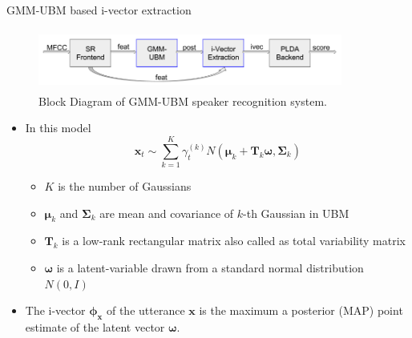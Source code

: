\documentclass{beamer}
\begin{document}
\begin{frame}{GMM-UBM based i-vector extraction}
\begin{figure}
      \centering
      \includegraphics[width=10cm, height=2cm]{figures/UBM_ivec_blockdiagram.png}
      \vspace{-4pt}
      \caption{Block Diagram of GMM-UBM speaker recognition system.}
      \label{fig:gmm_ivec2}
  \end{figure}
  \vspace{-15pt}
  \begin{itemize}
  \item { In this model
    \begin{equation}
     \mathbf{x}_t \sim \sum_{k=1}^{K} \gamma_{t}^{(k)} N( \boldsymbol{\mu}_k + \mathbf{T}_k\boldsymbol{\omega}, \mathbf{\Sigma}_k)
   \end{equation}
    \begin{itemize}
        \item  $K$ is the number of Gaussians
        \item  $\boldsymbol{\mu}_k$ and $\mathbf{\Sigma}_k$ are mean and covariance of $k$-th Gaussian in UBM
        \item $\mathbf{T}_k$ is a low-rank rectangular matrix also called as total variability matrix
        \item $\boldsymbol{\omega}$ is a latent-variable drawn from a standard normal distribution $N(0,I)$
    \end{itemize} }
    \item The i-vector $\boldsymbol{\phi_x}$ of the utterance $\mathbf{x}$ is the maximum a posterior (MAP) point estimate of the latent vector $\boldsymbol{\omega}$.
  \end{itemize}
\end{frame}
\end{document}
